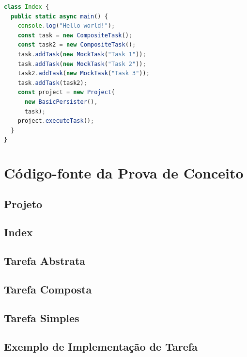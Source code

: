 \documentclass[12pt]{tcc}
\begin{document}
\begin{lstlisting}[label={lst:index_ts}, caption={Exemplo de roteiro principal para executar a prova de conceito.}, language=TypeScript]
class Index {
  public static async main() {
    console.log("Hello world!");
    const task = new CompositeTask();
    const task2 = new CompositeTask();
    task.addTask(new MockTask("Task 1"));
    task.addTask(new MockTask("Task 2"));
    task2.addTask(new MockTask("Task 3"));
    task.addTask(task2);
    const project = new Project(
      new BasicPersister(),
      task);
    project.executeTask();
  }
}
\end{lstlisting}


\chapter{Código-fonte da Prova de Conceito}
\label{apx:mock_source}

\section{Projeto}


\section{Index}


\section{Tarefa Abstrata}


\section{Tarefa Composta}


\section{Tarefa Simples}


\section{Exemplo de Implementação de Tarefa}

\end{document}
